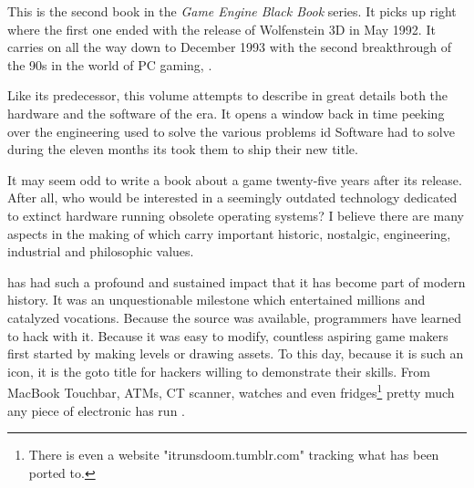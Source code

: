 This is the second book in the \textit{Game Engine Black Book} series. It picks up right where the first one ended with the release of Wolfenstein 3D in May 1992. It carries on all the way down to December 1993 with the second breakthrough of the 90s in the world of PC gaming, \doom.\\
\par
 Like its predecessor, this volume attempts to describe in great details both the hardware and the software of the era. It opens a window back in time peeking over the engineering used to solve the various problems id Software had to solve during the eleven months its took them to ship their new title.\\%
\par
It may seem odd to write a book about a game twenty-five years after its release. After all, who would be interested in a seemingly outdated technology dedicated to extinct hardware running obsolete operating systems? I believe there are many aspects in the making of \doom which carry important historic, nostalgic, engineering, industrial and philosophic values.\\ 

\par
\doom has had such a profound and sustained impact that it has become part of modern history. It was an unquestionable milestone which entertained millions and catalyzed vocations. Because the source was available, programmers have learned to hack with it. Because it was easy to modify, countless aspiring game makers first started by making levels or drawing assets. To this day, because it is such an icon, it is the goto title for hackers willing to demonstrate their skills. From MacBook Touchbar, ATMs, CT scanner, watches and even fridges\footnote{There is even a website "itrunsdoom.tumblr.com" tracking what \doom has been ported to.} pretty much any piece of electronic has run \doom.\\
\par

